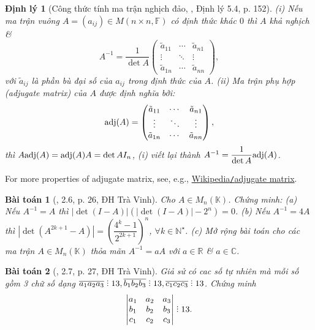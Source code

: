 \documentclass{article}
\newtheorem{baitoan}{Bài toán}
\newtheorem{dinhly}{Định lý}
\DeclareRobustCommand{\divby}{%
	\mathrel{\vbox{\baselineskip.65ex\lineskiplimit0pt\hbox{.}\hbox{.}\hbox{.}}}%
}
\begin{document}
\begin{dinhly}[Công thức tính ma trận nghịch đảo, \cite{Hung_linear_algebra}, Định lý 5.4, p. 152]
	(i) Nếu ma trận vuông $A = (a_{ij})\in M(n\times n,\mathbb{F})$ có định thức khác $0$ thì $A$ khả nghịch \&
	\begin{equation*}
		A^{-1} = \frac{1}{\det A}\begin{pmatrix}
			\tilde{a}_{11} & \cdots & \tilde{a}_{n1}\\\vdots & \ddots & \vdots\\\tilde{a}_{1n} & \cdots & \tilde{a}_{nn}
		\end{pmatrix},
	\end{equation*}
	với $\tilde{a}_{ij}$ là phần bù đại số của $a_{ij}$ trong định thức của $A$. (ii) {\rm Ma trận phụ hợp} (adjugate matrix) của $A$ được định nghĩa bởi:
	\begin{equation*}
		{\rm adj}(A) = \begin{pmatrix}
			\tilde{a}_{11} & \cdots & \tilde{a}_{n1}\\\vdots & \ddots & \vdots\\\tilde{a}_{1n} & \cdots & \tilde{a}_{nn}
		\end{pmatrix},
	\end{equation*}
	thì $A{\rm adj}(A) = {\rm adj}(A)A = \det A I_n$, (i) viết lại thành $A^{-1} = \dfrac{1}{\det A}{\rm adj}(A)$.
\end{dinhly}
For more properties of adjugate matrix, see, e.g., \href{https://en.wikipedia.org/wiki/Adjugate_matrix}{Wikipedia{\tt/}adjugate matrix}.

\begin{baitoan}[\cite{VMS_VMC2024}, 2.6, p. 26, ĐH Trà Vinh]
	Cho $A\in M_n(\mathbb{K})$. Chứng minh: (a) Nếu $A^{-1} = A$ thì $|\det(I - A)|(|\det(I - A)| - 2^n) = 0$. (b) Nếu $A^{-1} = 4A$ thì $|\det(A^{2k+1} - A)| = \left(\dfrac{4^k - 1}{2^{2k + 1}}\right)^n$, $\forall k\in\mathbb{N}^\star$. (c) Mở rộng bài toán cho các ma trận $A\in M_n(\mathbb{K})$ thỏa mãn $A^{-1} = aA$ với $a\in\mathbb{R}$ \& $a\in\mathbb{C}$.
\end{baitoan}

\begin{baitoan}[\cite{VMS_VMC2024}, 2.7, p. 27, ĐH Trà Vinh]
	Giả sử có cac số tự nhiên mà mỗi số gồm 3 chữ số dạng $\overline{a_1a_2a_3}\divby13,\overline{b_1b_2b_3}\divby13,\overline{c_1c_2c_3}\divby13$. Chứng minh
	\begin{equation*}
		\begin{vmatrix}
			a_1 & a_2 & a_3\\b_1 & b_2 & b_3\\c_1 & c_2 & c_3
		\end{vmatrix}\divby13.
	\end{equation*}
\end{baitoan}
\end{document}
